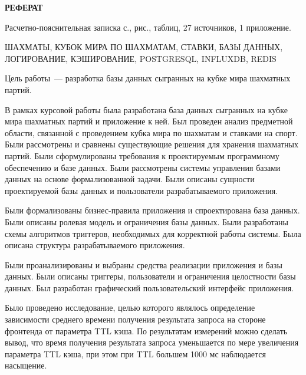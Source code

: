 \begin{center}
	\LARGE\bfseries{РЕФЕРАТ}
\end{center}

Расчетно-пояснительная записка \pageref{LastPage} с., \totalfigures{} рис., \totaltables{} таблиц, 27 источников, 1 приложение.

ШАХМАТЫ, КУБОК МИРА ПО ШАХМАТАМ, СТАВКИ, БАЗЫ ДАННЫХ, ЛОГИРОВАНИЕ, КЭШИРОВАНИЕ, POSTGRESQL, INFLUXDB, REDIS

Цель работы~--- разработка базы данных сыгранных на кубке мира шахматных партий.

В рамках курсовой работы была разработана база данных сыгранных на кубке мира шахматных партий и приложение к ней. Был проведен анализ предметной области, связанной с проведением кубка мира по шахматам и ставками на спорт. Были рассмотрены и сравнены существующие решения для хранения шахматных партий. Были сформулированы требования к проектируемым программному обеспечению и базе данных. Были рассмотрены системы управления базами данных на основе формализованной задачи. Были описаны сущности проектируемой базы данных и пользователи разрабатываемого приложения.

Были формализованы бизнес-правила приложения и спроектирована база данных. Были описаны ролевая модель и ограничения базы данных. Были разработаны схемы алгоритмов триггеров, необходимых для корректной работы системы. Была описана структура разрабатываемого приложения.

Были проанализированы и выбраны средства реализации приложения и базы данных. Были описаны триггеры, пользователи и ограничения целостности базы данных. Был разработан графический пользовательский интерфейс приложения.

Было проведено исследование, целью которого являлось определение зависимости среднего времени получения результата запроса на стороне фронтенда от параметра TTL кэша. По результатам измерений можно сделать вывод, что время получения результата запроса уменьшается по мере увеличения параметра TTL кэша, при этом при TTL большем 1000 мс наблюдается насыщение.

